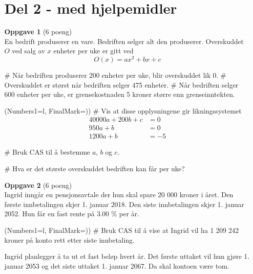 \section*{Del 2 - med hjelpemidler}
\vspace*{2em}
{\bfseries \large Oppgave 1} (6 poeng) \vspace*{1em} \\
En bedrift produserer en vare.
Bedriften selger alt den produserer.
Overskuddet $O$ ved salg av $x$ enheter per uke er gitt ved
\begin{equation*}
	O(x) = ax^2 + bx + c
\end{equation*}
\begin{easylist}[itemize]
	# Når bedriften produserer 200 enheter per uke,
	blir overskuddet lik 0.
	# Overskuddet er størst når bedriften
	selger 475 enheter.
	# Når bedriften selger 600 enheter per uke,
	er grensekostnaden 5 kroner større enn grenseinntekten.
\end{easylist}
\begin{easylist}[enumerate]
	\ListProperties(Numbers1=l, FinalMark={)})
	# Vis at disse opplysningene gir likningssystemet
	\begin{align*}
	 40000a + 200b + c &= 0 \\
	 950 a + b &= 0 \\
	 1200a + b &= -5
	\end{align*}
	
	# Bruk CAS til å bestemme $a$, $b$ og $c$.
	
	# Hva er det største overskuddet bedriften
	kan får per uke?
\end{easylist}
\vfill
\vspace*{2em}
{\bfseries \large Oppgave 2} (6 poeng) \vspace*{1em} \\
Ingrid inngår en pensjonsavtale der hun skal spare 20 000
kroner i året. Den første innbetalingen skjer 1. januar 2018.
Den siste innbetalingen skjer 1. januar 2052.
Hun får en fast rente på 3.00 \% per år.
\begin{easylist}[enumerate]
	\ListProperties(Numbers1=l, FinalMark={)})
	# Bruk CAS til å vise at Ingrid vil ha
	1 209 242 kroner på konto rett etter
	siste innbetaling.
\end{easylist}
Ingrid planlegger å ta ut et fast beløp hvert år.
Det første uttaket vil hun gjøre 1. januar 2053 og
det siste uttaket 1. januar 2067. Da skal kontoen være tom.
